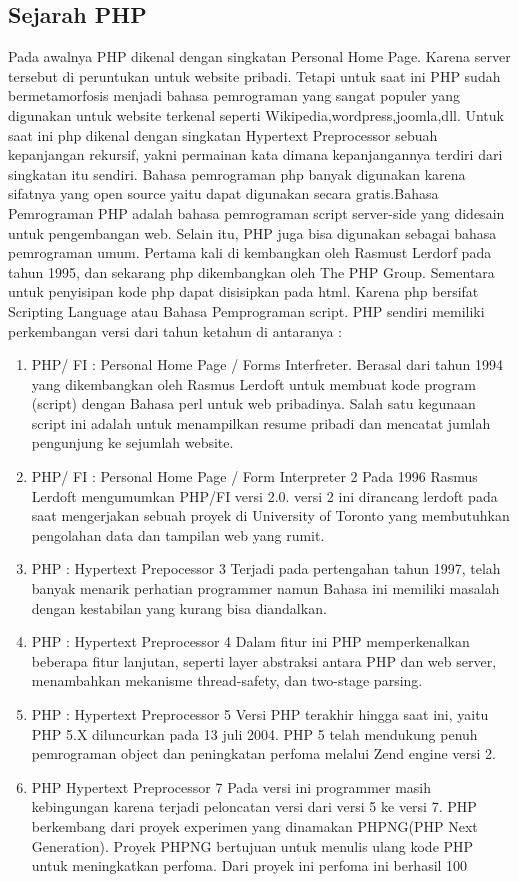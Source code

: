 \subsection{Sejarah PHP}
Pada awalnya PHP dikenal dengan singkatan Personal Home Page. Karena server tersebut di peruntukan untuk website pribadi. Tetapi untuk saat ini PHP sudah bermetamorfosis menjadi bahasa pemrograman yang sangat populer yang digunakan untuk website terkenal seperti Wikipedia,wordpress,joomla,dll.
Untuk saat ini php dikenal dengan singkatan Hypertext Preprocessor sebuah kepanjangan rekursif, yakni permainan kata dimana kepanjangannya terdiri dari singkatan itu sendiri. Bahasa pemrograman php banyak digunakan karena sifatnya yang open source yaitu dapat digunakan secara gratis.Bahasa Pemrograman PHP adalah bahasa pemrograman script server-side yang didesain untuk pengembangan web. Selain itu, PHP juga bisa digunakan sebagai bahasa pemrograman umum. Pertama kali di kembangkan oleh Rasmust Lerdorf pada tahun 1995, dan sekarang php dikembangkan oleh The PHP Group.
Sementara untuk penyisipan kode php dapat disisipkan pada html. Karena php bersifat Scripting Language atau Bahasa Pemprograman script. PHP sendiri memiliki perkembangan versi dari tahun ketahun di antaranya :
  \begin{enumerate}
     \item PHP/ FI : Personal Home Page / Forms Interfreter.
      Berasal dari tahun 1994 yang dikembangkan oleh Rasmus Lerdoft untuk membuat kode program (script) dengan Bahasa perl untuk web pribadinya. Salah satu kegunaan script ini adalah untuk menampilkan resume pribadi dan mencatat jumlah pengunjung ke sejumlah website.
     \item PHP/ FI : Personal Home Page / Form Interpreter 2
      Pada 1996 Rasmus Lerdoft mengumumkan PHP/FI versi 2.0. versi 2 ini dirancang lerdoft pada saat mengerjakan sebuah proyek di University of Toronto yang membutuhkan pengolahan data dan tampilan web yang rumit.
     \item PHP : Hypertext Prepocessor 3
      Terjadi pada pertengahan tahun 1997, telah banyak menarik perhatian programmer namun Bahasa ini memiliki masalah dengan kestabilan yang kurang bisa diandalkan.
     \item PHP : Hypertext Preprocessor 4
      Dalam fitur ini PHP memperkenalkan beberapa fitur lanjutan, seperti layer abstraksi antara PHP dan web server, menambahkan mekanisme thread-safety, dan two-stage parsing.
    \item PHP : Hypertext Preprocessor 5
      Versi PHP terakhir hingga saat ini, yaitu PHP 5.X diluncurkan pada 13 juli 2004. PHP 5 telah mendukung penuh pemrograman object dan peningkatan perfoma melalui Zend engine versi 2.
    \item PHP Hypertext Preprocessor 7
      Pada versi ini programmer masih kebingungan karena terjadi peloncatan versi dari versi 5 ke versi 7. PHP berkembang dari proyek experimen yang dinamakan PHPNG(PHP Next Generation). Proyek PHPNG bertujuan untuk menulis ulang kode PHP untuk meningkatkan perfoma. Dari proyek ini perfoma ini berhasil 100%
 \end{enumerate}

